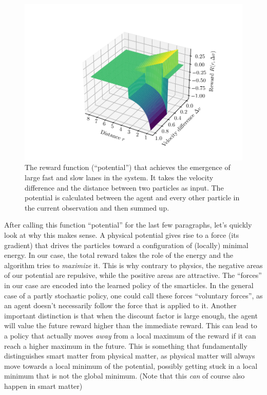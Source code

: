 \begin{figure}[H]
    \centering
    \includegraphics{lane_reward_func_3d_cropped.pdf}
    \caption{The reward function (\enquote{potential}) that achieves the emergence of large fast and slow lanes in the system. It takes the velocity difference and the distance between two particles as input. The potential is calculated between the agent and every other particle in the current observation and then summed up.}
    \label{fig:lane_reward_func_3d}
\end{figure}

After calling this function \enquote{potential} for the last few paragraphs, let's quickly look at why this makes sense. A physical potential gives rise to a force (its gradient) that drives the particles toward a configuration of (locally) minimal energy. In our case, the total reward takes the role of the energy and the algorithm tries to \textit{maximize} it. This is why contrary to physics, the negative areas of our potential are repulsive, while the positive areas are attractive. The \enquote{forces} in our case are encoded into the learned policy of the smarticles. In the general case of a partly stochastic policy, one could call these forces \enquote{voluntary forces}, as an agent doesn't necessarily follow the force that is applied to it. Another important distinction is that when the discount factor is large enough, the agent will value the future reward higher than the immediate reward. This can lead to a policy that actually moves \textit{away} from a local maximum of the reward if it can reach a higher maximum in the future. This is something that fundamentally distinguishes smart matter from physical matter, as physical matter will always move towards a local minimum of the potential, possibly getting stuck in a local minimum that is not the global minimum. (Note that this \textit{can} of course also happen in smart matter)


